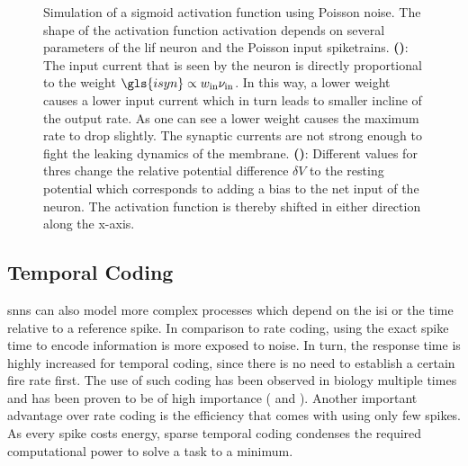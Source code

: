 \begin{figure}
	\begin{subfigure}[c]{0.5\textwidth}
		\centering
		\caption{}
		
		\label{theoreticalactivationfunctionweight}
	\end{subfigure}	
	\begin{subfigure}[c]{0.5\textwidth}
		\centering
		\caption{}
		
		\label{theoreticalactivationfunctionbias}
	\end{subfigure}
	\caption[Simulation of a sigmoid activation function using Poisson noise]{Simulation of a sigmoid activation function using Poisson noise. The shape of the activation function \gls{activation} depends on several parameters of the \gls{lif} neuron and the Poisson input  spiketrains. \textbf{()}: The input current that is seen by the neuron is directly proportional to the weight $\gls{isyn} \propto w_\text{in} \nu_\text{in}$. In this way, a lower weight causes a lower input current which in turn leads to smaller incline of the output rate. As one can see a lower weight causes the maximum rate to drop slightly. The synaptic currents are not strong enough to fight the leaking dynamics of the membrane. \textbf{()}: Different values for \gls{thres} change the relative potential difference $\delta V$ to the resting potential which corresponds to adding a bias to the net input of the neuron. The activation function is thereby shifted in either direction along the x-axis.}
\end{figure}

\pagebreak
\subsection{Temporal Coding}
\glspl{snn} can also model more complex processes which depend on the \gls{isi} or the time relative to a reference spike. In comparison to rate coding, using the exact spike time to encode information is more exposed to noise. In turn, the response time is highly increased for temporal coding, since there is no need to establish a certain fire rate first. The use of such coding has been observed in biology multiple times and has been proven to be of high importance (\citealp{gerstner1996neuronal} and \citealp{rieke1999spikes}). Another important advantage over rate coding is the efficiency that comes with using only few spikes. As every spike costs energy, sparse temporal coding condenses the required computational power to solve a task to a minimum. 

